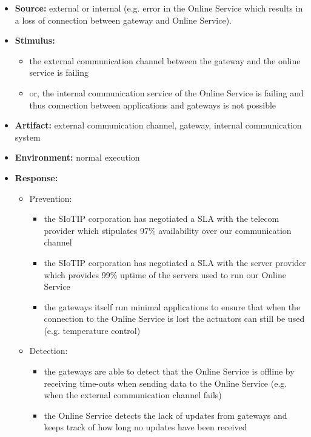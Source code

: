 \documentclass[english]{sareport}
\begin{document}
\begin{itemize}
    \item \textbf{Source:} external or internal (e.g. error in the Online Service which results in a loss of connection between gateway and Online Service).
    \item \textbf{Stimulus:}
        \begin{itemize}
            \item the external communication channel between the gateway and the online service is failing
            \item or, the internal communication service of the Online Service is failing and thus connection between applications and gateways is not possible
        \end{itemize}

    \item \textbf{Artifact:} external communication channel, gateway, internal communication system
    \item \textbf{Environment:} normal execution
    \item \textbf{Response:}
        \begin{itemize}
            \item Prevention:
            \begin{itemize}
            	\item the SIoTIP corporation has negotiated a SLA with the telecom provider which stipulates 97\% availability over our communication channel 
            	\item the SIoTIP corporation has negotiated a SLA with the server provider which provides 99\% uptime of the servers used to run our Online Service
            	\item the gateways itself run minimal applications to ensure that when the connection to the Online Service is lost the actuators can still be used (e.g. temperature control)
            \end{itemize}
            \item Detection:
            \begin{itemize}
            	\item the gateways are able to detect that the Online Service is offline by receiving time-outs when sending data to the Online Service (e.g. when the external communication channel fails)
            	\item the Online Service detects the lack of updates from gateways and keeps track of how long no updates have been received
            \end{itemize}

\end{itemize}
\end{itemize}
\end{document}
